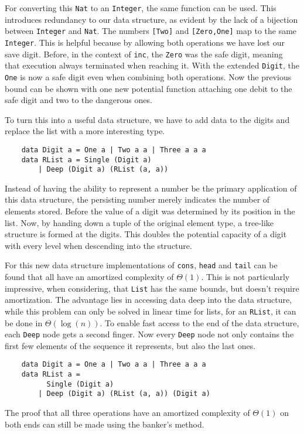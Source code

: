 For converting this \texttt{Nat} to an \texttt{Integer}, the same function can be used. This introduces redundancy to our data structure, as evident by the lack of a bijection between \texttt{Integer} and \texttt{Nat}. The numbers \texttt{[Two]} and \texttt{[Zero,One]} map to the same \texttt{Integer}. This is helpful because by allowing both operations we have lost our save digit. Before, in the context of \texttt{inc}, the \texttt{Zero} was the safe digit, meaning that execution always terminated when reaching it. With the extended \texttt{Digit}, the \texttt{One} is now a safe digit even when combining both operations. Now the previous bound can be shown with one new potential function attaching one debit to the safe digit and two to the dangerous ones.\par
To turn this into a useful data structure, we have to add data to the digits and replace the list with a more interesting type.
\begin{verbatim}
    data Digit a = One a | Two a a | Three a a a
    data RList a = Single (Digit a) 
        | Deep (Digit a) (RList (a, a))
\end{verbatim}
Instead of having the ability to represent a number be the primary application of this data structure, the persisting number merely indicates the number of elements stored. Before the value of a digit was determined by its position in the list. Now, by handing down a tuple of the original element type, a tree-like structure is formed at the digits. This doubles the potential capacity of a digit with every level when descending into the structure.\par
For this new data structure implementations of \texttt{cons}, \texttt{head} and \texttt{tail} can be found that all have an amortized complexity of \(\Theta(1)\). This is not particularly impressive, when considering, that \texttt{List} has the same bounds, but doesn't require amortization. The advantage lies in accessing data deep into the data structure, while this problem can only be solved in linear time for lists, for an \texttt{RList}, it can be done in \(\Theta(\log (n))\). To enable fast access to the end of the data structure, each \texttt{Deep} node gets a second finger. Now every \texttt{Deep} node not only contains the first few elements of the sequence it represents, but also the last ones.
\begin{verbatim}
    data Digit a = One a | Two a a | Three a a a
    data RList a =
          Single (Digit a)
        | Deep (Digit a) (RList (a, a)) (Digit a) 
\end{verbatim}
The proof that all three operations have an amortized complexity of \(\Theta(1)\) on both ends can still be made using the banker's method.

